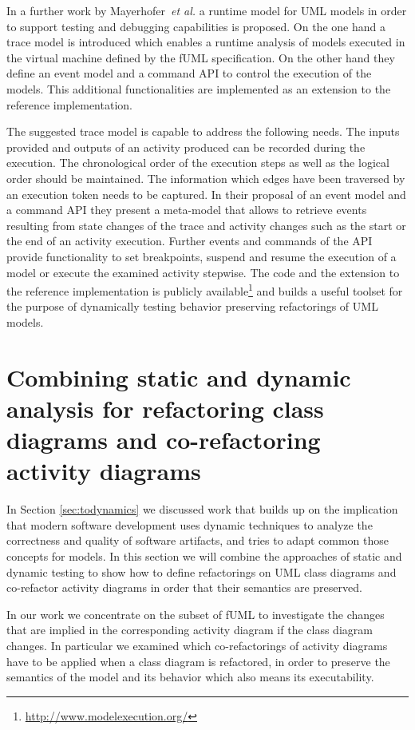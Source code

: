 \documentclass{llncs}
\begin{document}
In a further work by Mayerhofer~\textit{et al.} \cite{DBLP:conf/models/MayerhoferLK12} a runtime model for UML models 
in order to support testing and debugging capabilities is proposed. On the one hand a trace model is introduced which enables 
a runtime analysis of models executed in the virtual machine defined by the fUML specification. On the other hand they 
define an event model and a command API to control the execution of the models. This additional functionalities are implemented 
as an extension to the reference implementation.

The suggested trace model is capable to address the following needs. The inputs provided and outputs of an activity produced 
can be recorded during the execution. The chronological order of the execution steps as well as the logical order should be 
maintained. The information which edges have been traversed by an execution token needs to be captured. In their proposal of 
an event model and a command API they present a meta-model that allows to retrieve events resulting from state changes of the 
trace and activity changes such as the start or the end of an activity execution. Further events and commands of the API 
provide functionality to set breakpoints, suspend and resume the execution of a model or execute the examined activity stepwise.
The code and the extension to the reference implementation is publicly available\footnote{\url{http://www.modelexecution.org/}} 
and builds a useful toolset for the purpose of dynamically testing behavior preserving refactorings of UML models.

\section{Combining static and dynamic analysis for refactoring class diagrams and co-refactoring activity diagrams}
\label{sec:combine}

In Section \ref{sec:todynamics} we discussed work that builds up on the implication that modern software development uses 
dynamic techniques to analyze the correctness and quality of software artifacts, and tries to adapt common those concepts for 
models. In this section we will combine the approaches of static and dynamic testing to show how to define refactorings on 
UML class diagrams and co-refactor activity diagrams in order that their semantics are preserved.

In our work we concentrate on the subset of fUML to investigate the changes that are implied in the corresponding
activity diagram if the class diagram changes. In particular we examined which co-refactorings of activity diagrams 
have to be applied when a class diagram is refactored, in order to preserve the semantics of the model 
and its behavior which also means its executability. 
\end{document}
